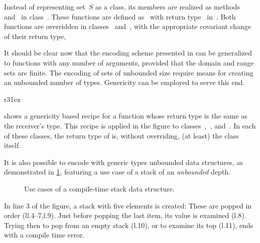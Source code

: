 \documentclass[a4paper,USenglish]{lipics-v2016}
\def\ReplaceInThesis#1#2{#1}
\begin{document}
Instead of representing set~$S$ as a class,
  its members are realized as methods~ and~ in class~.
These functions are defined as~ with return type~
  in~.
Both functions are overridden in classes~ and~,
   with the appropriate covariant change of their return type,

It should be clear now that the encoding scheme presented
in \Cref{Figure:simple-binary\ReplaceInThesis{}{-a}} can be generalized to functions
  with any number of arguments, provided that the domain and range sets are finite.
The encoding of sets of unbounded size require means for creating an unbounded
 number of types.
Genericity can be employed to serve this end.

\ReplaceInThesis{\begin{wrapfigure}[8]{r}{31ex}
  \intextsep=0pt
  \caption{\label{Figure:id}  Covariant return type of function \cc{id()}
  with \Java generics.
  }
  \javaInput[,minipage,width=31ex]{id.listing}
\end{wrapfigure}
}{\begin{figure}[ht]
  \caption{\label{Figure:id}    Covariant return type of function \cc{id()}
    with \Java generics.  }
  \javaInput[minipage,left=-2ex,width=\linewidth]{id.listing}
\end{figure}
}

 shows a genericity based recipe for
  a function whose return type
  is the same as the receiver's type.
  This recipe is applied in the figure to classes~,~, and~.
  In each of these classes, the return type of  is,
  without overriding, (at least) the class itself.

It is also possible to encode with \Java generic types
  unbounded data structures, 
  as demonstrated in \cref{Figure:stack-use-cases},
  featuring a use case of a stack of an \emph{unbounded} depth.
\vspace{2ex}

\begin{figure}[ht]
  \caption{\label{Figure:stack-use-cases}    Use cases of a compile-time stack data structure.
  }
\end{figure}

In line 3 of the figure, a stack with five elements is created:
These are popped in order (ll.4--7,l.9).
Just before popping the last item, its value is examined (l.8).
Trying then to pop from an empty stack (l.10), or to examine its top (l.11), ends with
  a compile time error.
\end{document}
